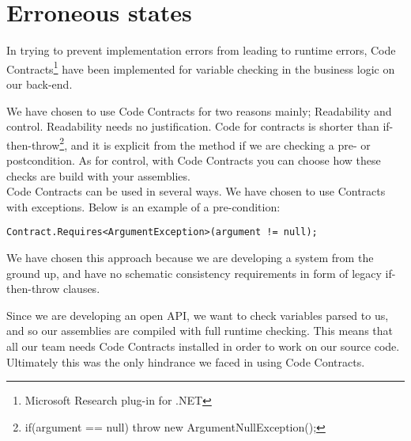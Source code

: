 \documentclass[../report.tex]{subfiles}
\begin{document}
\section{Erroneous states}

In trying to prevent implementation errors from leading to runtime errors, Code Contracts\footnote{Microsoft Research plug-in for .NET} have been implemented for variable checking in the business logic on our back-end.

We have chosen to use Code Contracts for two reasons mainly; Readability and control. Readability needs no justification. Code for contracts is shorter than if-then-throw\footnote{if(argument == null) throw new ArgumentNullException();}, and it is explicit from the method if we are checking a pre- or postcondition. As for control, with Code Contracts you can choose how these checks are build with your assemblies. \\

Code Contracts can be used in several ways. We have chosen to use Contracts with  exceptions. Below is an example of a pre-condition:

 \texttt{Contract.Requires<ArgumentException>(argument != null);}
 
We have chosen this approach because we are developing a system from the ground up, and have no schematic consistency requirements in form of legacy if-then-throw clauses.

Since we are developing an open API, we want to check variables parsed to us, and so our assemblies are compiled with full runtime checking. This means that all our team needs Code Contracts installed in order to work on our source code. Ultimately this was the only hindrance we faced in using Code Contracts.
\end{document}

